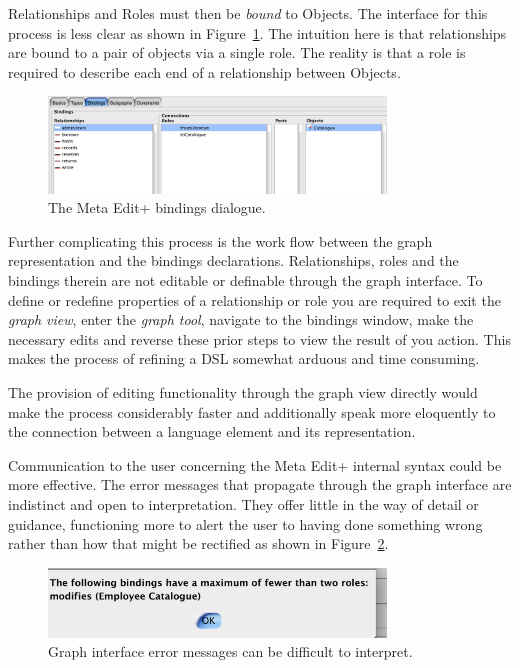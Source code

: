 Relationships and Roles must then be \emph{bound} to Objects. The interface for this process is less clear as shown in Figure~\ref{fig:bindings}. The intuition here is that relationships are bound to a pair of objects via a single role. The reality is that a role is required to describe each end of a relationship between Objects. \par

  \begin{figure}[h]
    \centering
    \includegraphics[width=0.8\textwidth]{images/bindings.png}
    \caption{The Meta Edit+ bindings dialogue.}
    \label{fig:bindings}
  \end{figure}

Further complicating this process is the work flow between the graph representation and the bindings declarations. Relationships, roles and the bindings therein are not editable or definable through the graph interface. To define or redefine properties of a relationship or role you are required to exit the \emph{graph view}, enter the \emph{graph tool}, navigate to the bindings window, make the necessary edits and reverse these prior steps to view the result of you action. This makes the process of refining a DSL somewhat arduous and time consuming.\par The provision of editing functionality through the graph view directly would make the process considerably faster and additionally speak more eloquently to the connection between a language element and its representation.\par
Communication to the user concerning the Meta Edit+ internal syntax could be more effective.
The error messages that propagate through the graph interface are indistinct and open to interpretation. They offer little in the way of detail or guidance, functioning more to alert the user to having done something wrong rather than how that might be rectified as shown in Figure~\ref{fig:error}. \par

  \begin{figure}[h]
    \centering
    \includegraphics[width=0.8\textwidth]{images/entity_error.png}
    \caption{Graph interface error messages can be difficult to interpret.}
    \label{fig:error}
  \end{figure}

